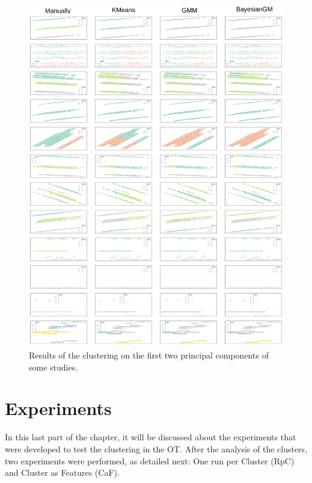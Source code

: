 \begin{figure}[H]
   \centering
   \includegraphics[width=\linewidth]{fig/ch3-clustering-studies.png}
   \caption{Results of the clustering on the first two principal components of some studies.}
   \label{fig:clustering-studies}
\end{figure}

\section{Experiments}

\newcommand{\nameExperimentI}{RpC}
\newcommand{\nameExperimentII}{CaF}


In this last part of the chapter, it will be discussed about the experiments that were developed to test the clustering in the OT. After the analysis of the clusters, two experiments were performed, as detailed next: One run per Cluster (\nameExperimentI{}) and Cluster as Features (\nameExperimentII{}).

